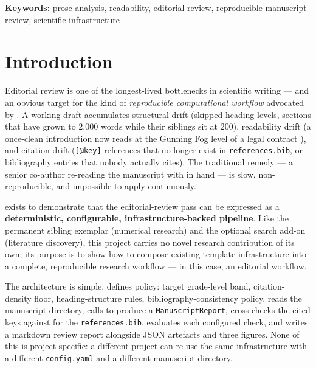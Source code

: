 \documentclass[
]{article}
\begin{document}
\textbf{Keywords:} prose analysis, readability, editorial review,
reproducible manuscript review, scientific infrastructure

\newpage

\section{Introduction}\label{sec:introduction}

Editorial review is one of the longest-lived bottlenecks in scientific
writing --- and an obvious target for the kind of \emph{reproducible
computational workflow} advocated by \citep{peng2011reproducible}. A
working draft accumulates structural drift (skipped heading levels,
sections that have grown to 2,000 words while their siblings sit at
200), readability drift (a once-clean introduction now reads at the
Gunning Fog level of a legal contract \citep{gunning1952technique}), and
citation drift (\texttt{{[}@key{]}} references that no longer exist in
\texttt{references.bib}, or bibliography entries that nobody actually
cites). The traditional remedy --- a senior co-author re-reading the
manuscript with \citep{strunk2000elements} in hand --- is slow,
non-reproducible, and impossible to apply continuously.

 exists to demonstrate that the
editorial-review pass can be expressed as a \textbf{deterministic,
configurable, infrastructure-backed pipeline}. Like the permanent
sibling exemplar
\href{../../template_code_project}{}
(numerical research) and the optional search add-on
\href{../../../projects_archive/template_search_project}{}
(literature discovery), this project carries no novel research
contribution of its own; its purpose is to show how to compose existing
template infrastructure into a complete, reproducible research workflow
--- in this case, an editorial workflow.

The architecture is simple.  defines
policy: target grade-level band, citation-density floor,
heading-structure rules, bibliography-consistency policy.
 reads the manuscript
directory, calls
\href{../../../infrastructure/prose/SKILL.md}{}
to produce a \texttt{ManuscriptReport}, cross-checks the cited keys
against
\href{../../../infrastructure/reference/citation/SKILL.md}{}
for the \texttt{references.bib}, evaluates each configured check, and
writes a markdown review report alongside JSON artefacts and three
figures. None of this is project-specific: a different project can
re-use the same infrastructure with a different \texttt{config.yaml} and
a different manuscript directory.
\end{document}
